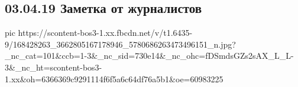  
 
 
 
 

\subsection{03.04.19 Заметка от журналистов}


\ifcmt
  pic https://scontent-bos3-1.xx.fbcdn.net/v/t1.6435-9/168428263_3662805167178946_5780686263473496151_n.jpg?_nc_cat=101&ccb=1-3&_nc_sid=730e14&_nc_ohc=fDSmdsGZs2sAX_L_L-3&_nc_ht=scontent-bos3-1.xx&oh=6366369c9291114f6f5a6c64df76a5b1&oe=60983225
\fi


